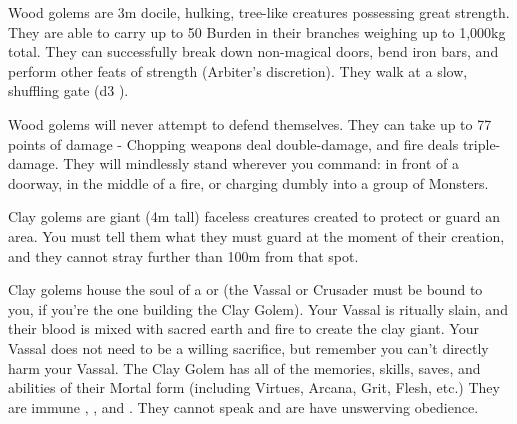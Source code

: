 

Wood golems are 3m docile, hulking, tree-like creatures possessing great strength. They are able to carry up to 50 Burden in their branches weighing up to 1,000kg total.  They can successfully break down non-magical doors, bend iron bars, and perform other feats of strength (Arbiter's discretion).  They walk at a slow, shuffling gate (d3 \MD).

Wood golems will never attempt to defend themselves.  They can take up to 77 points of damage - Chopping weapons deal double-damage, and fire deals triple-damage.  They will mindlessly stand wherever you command: in front of a doorway, in the middle of a fire, or charging dumbly into a group of Monsters.


Clay golems are giant (4m tall) faceless creatures created to protect or guard an area.  You must tell them what they must guard at the moment of their creation, and they cannot stray further than 100m from that spot.  

Clay golems house the soul of a  or  (the Vassal or Crusader must be bound to you, if you're the one building the Clay Golem). Your Vassal is ritually slain, and their blood is mixed with sacred earth and fire to create the clay giant. Your Vassal does not need to be a willing sacrifice, but remember you can't directly harm your Vassal.  The Clay Golem has all of the memories, skills, saves, and abilities of their Mortal form (including Virtues, Arcana, Grit, Flesh, etc.)  They are immune , , and . They cannot speak and are have unswerving obedience.

